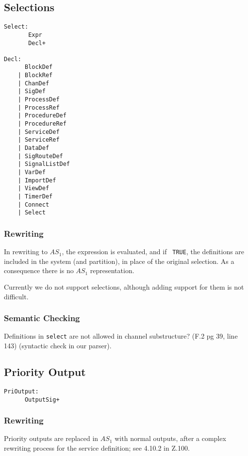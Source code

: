 \subsection{Selections}

\begin{verbatim}
Select:
       Expr
       Decl+

Decl:
      BlockDef
    | BlockRef
    | ChanDef
    | SigDef
    | ProcessDef
    | ProcessRef
    | ProcedureDef
    | ProcedureRef
    | ServiceDef
    | ServiceRef
    | DataDef
    | SigRouteDef
    | SignalListDef
    | VarDef
    | ImportDef
    | ViewDef
    | TimerDef
    | Connect
    | Select
\end{verbatim}

\subsubsection{Rewriting}

In rewriting to $AS_1$, the expression is evaluated, and if {\tt
TRUE}, the definitions are included in the system (and partition),
in place of the original selection.
As a consequence there is no $AS_1$ representation. 

Currently we do not support selections, although adding support for
them is not difficult.

\subsubsection{Semantic Checking}

Definitions in {\tt select} are not allowed in channel
substructure? (F.2 pg 39, line 143) (syntactic check in our parser).

\subsection{Priority Output}

\begin{verbatim}
PriOutput:
      OutputSig+
\end{verbatim}

\subsubsection{Rewriting}

Priority outputs are replaced in $AS_1$ with normal outputs, after a
complex rewriting process for the service definition; see 4.10.2 in
Z.100.

